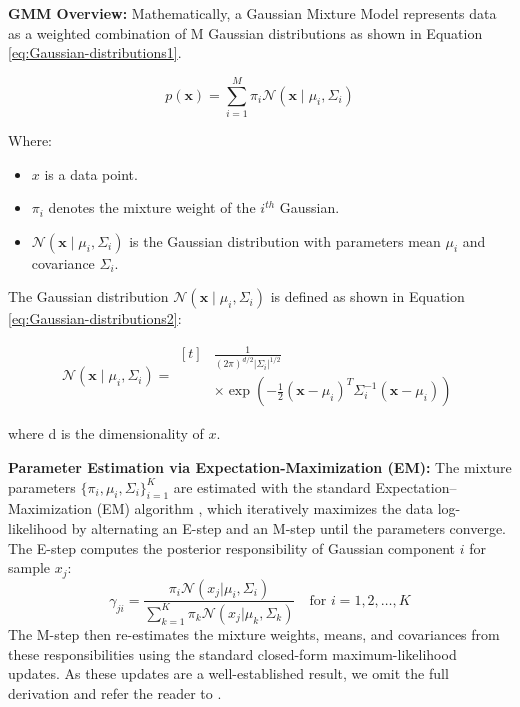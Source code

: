 \documentclass[lettersize,journal]{IEEEtran}
\begin{document}
	\textbf{GMM Overview:}
	Mathematically, a Gaussian Mixture Model represents data as a weighted combination of M Gaussian distributions as shown in Equation \ref{eq:Gaussian-distributions1}.
	
	\begin{equation}
		\label{eq:Gaussian-distributions1}
		p(\mathbf{x})=\sum_{i=1}^M \pi_i \mathcal{N}\left(\mathbf{x} \mid \mu_i, \Sigma_i\right)
	\end{equation}
	
	Where:
	\begin{itemize}
		\item $x$ is a data point.
		\item $\pi_i$ denotes the mixture weight of the $i^{{th }}$ Gaussian.
		\item $\mathcal{N}\left(\mathbf{x} \mid \mu_i, \Sigma_i\right)$ is the Gaussian distribution with parameters mean $\mu_i$ and covariance ${\Sigma}_i$.
	\end{itemize}
	
	The Gaussian distribution $\mathcal{N}\left(\mathbf{x} \mid \mu_i, {\Sigma}_i\right)$ is defined as shown in Equation \ref{eq:Gaussian-distributions2}:
	
	\begin{equation}
		\label{eq:Gaussian-distributions2}
		\mathcal{N}\left(\mathbf{x} \mid \mu_i, {\Sigma}_i\right) = 
		\begin{aligned}[t]
			&\frac{1}{(2 \pi)^{d / 2}\left|{\Sigma}_i\right|^{1 / 2}} \\
			&\times \exp \left(-\frac{1}{2}\left(\mathbf{x}-\mu_i\right)^T {\Sigma}_i^{-1}\left(\mathbf{x}-\mu_i\right)\right)
		\end{aligned}
	\end{equation}
	
	
	where d is the dimensionality of $x$.
	
		\textbf{Parameter Estimation via Expectation-Maximization (EM):}
		The mixture parameters $\{\pi_i, \mu_i, \Sigma_i\}_{i=1}^{K}$ are estimated with the standard Expectation--Maximization (EM) algorithm \cite{dempster_maximum_1977}, which iteratively maximizes the data log-likelihood by alternating an E-step and an M-step until the parameters converge. The E-step computes the posterior responsibility of Gaussian component $i$ for sample $x_j$:
		\begin{equation}\label{eq:E-Step}
			\gamma_{ji} = \frac{\pi_i \mathcal{N}(x_j | \mu_i, \Sigma_i)}{\sum_{k=1}^{K} \pi_k \mathcal{N}(x_j | \mu_k, \Sigma_k)} \quad \text{for } i = 1, 2, \dots, K
		\end{equation}
		The M-step then re-estimates the mixture weights, means, and covariances from these responsibilities using the standard closed-form maximum-likelihood updates. As these updates are a well-established result, we omit the full derivation and refer the reader to \cite{dempster_maximum_1977}.
	
\end{document}

